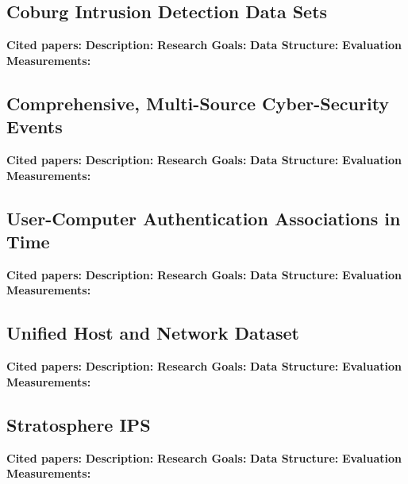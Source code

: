 \subsection{Coburg Intrusion Detection Data Sets}
\textbf{Cited papers:} \newline
\textbf{Description:} \newline
\textbf{Research Goals:}  \newline
\textbf{Data Structure:} \newline
\textbf{Evaluation Measurements:} \newline

\subsection{Comprehensive, Multi-Source Cyber-Security Events}
\textbf{Cited papers:} \newline
\textbf{Description:} \newline
\textbf{Research Goals:}  \newline
\textbf{Data Structure:} \newline
\textbf{Evaluation Measurements:} \newline

\subsection{User-Computer Authentication Associations in Time}
\textbf{Cited papers:} \newline
\textbf{Description:} \newline
\textbf{Research Goals:}  \newline
\textbf{Data Structure:} \newline
\textbf{Evaluation Measurements:} \newline

\subsection{Unified Host and Network Dataset}
\textbf{Cited papers:} \newline
\textbf{Description:} \newline
\textbf{Research Goals:}  \newline
\textbf{Data Structure:} \newline
\textbf{Evaluation Measurements:} \newline

\subsection{Stratosphere IPS}
\textbf{Cited papers:} \newline
\textbf{Description:} \newline
\textbf{Research Goals:}  \newline
\textbf{Data Structure:} \newline
\textbf{Evaluation Measurements:} \newline

